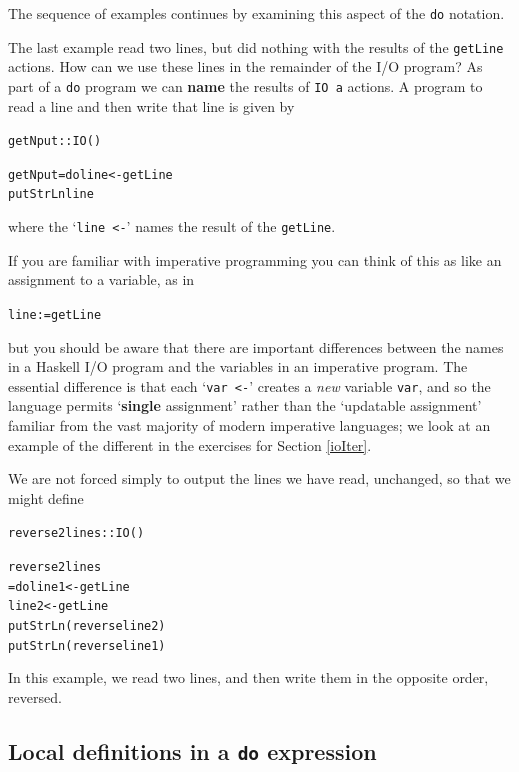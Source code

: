 The sequence of examples continues by examining this aspect of the \texttt{do} notation. 


\begin{example}
\vspace{-5pt}

The last example read two lines, but did nothing with the results of the
\texttt{getLine} actions. How can we use these lines in the remainder of
the I/O program? As part of a \texttt{do} program we can \textbf{name}
the results of \texttt{IO a} actions. A program to read a line and then
write that line is given by\minx{<-}
\begin{alltt}
getNput :: IO ()

getNput = do line <- getLine
             putStrLn line
\end{alltt}
where the `\texttt{line <-}' names the result of the \texttt{getLine}.

If you are familiar with imperative programming you can think of this as
like an assignment to a variable, as in 
\begin{alltt}
line := getLine
\end{alltt}
but you should be aware that there are important differences between the
names in a Haskell I/O program and the variables in an imperative
program. The essential difference is that each `\texttt{var <-}' creates a 
{\em new\/} variable \texttt{var}, and so the language 
permits `\textbf{single} assignment'
rather than the
`updatable assignment' familiar from the vast majority of modern imperative languages;
we look at an example of the different in the exercises for Section \ref{ioIter}.

We are not forced simply to output the lines we have read, unchanged, so
that we might define
\begin{alltt}
reverse2lines :: IO ()

reverse2lines
  = do line1 <- getLine
       line2 <- getLine
       putStrLn (reverse line2)
       putStrLn (reverse line1)
\end{alltt}
In this example, we read two lines, and then write them in the
opposite order, reversed.
\end{example}
\subsection*{Local definitions in a \texttt{do} expression}

